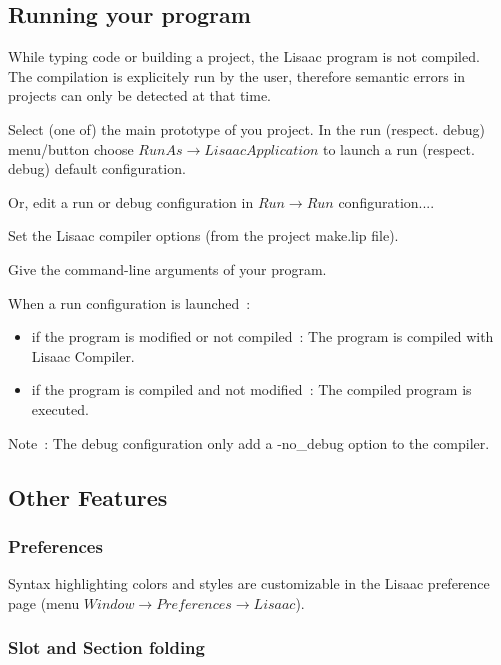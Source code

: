 \documentclass{article}
\begin{document}
\subsection{Running your program} 

While typing code or building a project, the Lisaac program is not compiled.\\
The compilation is explicitely run by the user, therefore semantic errors in projects can only be detected at that time.\\
\begin{enumerate}
\item{Select (one of) the main prototype of you project. In the run (respect. debug) menu/button choose $Run As \rightarrow Lisaac Application$ to launch a run (respect. debug) default configuration.
\item{Or, edit a run or debug configuration in $Run \rightarrow Run$ configuration....}
\item{Set the Lisaac compiler options (from the project make.lip file).}
\item{Give the command-line arguments of your program.}
}
\end{enumerate}
 
When a run configuration is launched~:
\begin{itemize}
\item{if the program is modified or not compiled~: The program is compiled with Lisaac Compiler.}
\item{if the program is compiled and not modified~: The compiled program is executed.}
\end{itemize} 

Note~: The debug configuration only add a -no\_debug option to the compiler.

\subsection{Other Features} 
\subsubsection{Preferences}

Syntax highlighting colors and styles are customizable in the Lisaac preference page (menu $Window \rightarrow Preferences \rightarrow Lisaac$).

\subsubsection{Slot and Section folding}
\end{document}
